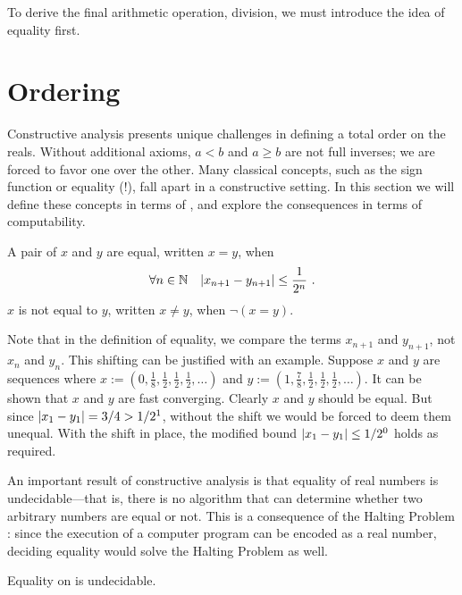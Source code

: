 \documentclass[leqno]{report}
\begin{document}
To derive the final arithmetic operation, division, we must introduce the idea of equality first.

\section{Ordering}

Constructive analysis presents unique challenges in defining a total order on the reals. Without additional axioms, $a < b$ and $a \geq b$ are not full inverses; we are forced to favor one over the other. Many classical concepts, such as the sign function or equality (!), fall apart in a constructive setting. In this section we will define these concepts in terms of \FCCS{}, and explore the consequences in terms of computability.

\begin{Definition}[Equality]
    A pair of \FCCS{} $x$ and $y$ are equal, written $x = y$, when
    \[
        \forall {n \in \mathbb{N}} \quad {\left| x_{n+1} - y_{n+1} \right| \leq \frac{1}{2^n}} \ .
    \]
    $x$ is not equal to $y$, written $x \neq y$, when $\neg (x = y)$.
\end{Definition}

Note that in the definition of equality, we compare the terms $x_{n+1}$ and $y_{n+1}$, not $x_n$ and $y_n$. This shifting can be justified with an example. Suppose $x$ and $y$ are sequences where $x := (0, \frac{1}{8}, \frac{1}{2}, \frac{1}{2}, \frac{1}{2}, \ldots)$ and $y := (1, \frac{7}{8}, \frac{1}{2}, \frac{1}{2}, \frac{1}{2}, \ldots)$. It can be shown that $x$ and $y$ are fast converging. Clearly $x$ and $y$ should be equal. But since $\left| x_1 - y_1 \right| = 3/4 > 1/2^1$, without the shift we would be forced to deem them unequal. With the shift in place, the modified bound $\left| x_1 - y_1 \right| \leq 1/2^0$ holds as required.

An important result of constructive analysis is that equality of real numbers is undecidable---that is, there is no algorithm that can determine whether two arbitrary numbers are equal or not. This is a consequence of the Halting Problem \citep{turing1936computable}: since the execution of a computer program can be encoded as a real number, deciding equality would solve the Halting Problem as well.

\begin{Proposition} \label{equality_undecidable}
    Equality on \FCCS{} is undecidable.
\end{Proposition}
\end{document}
